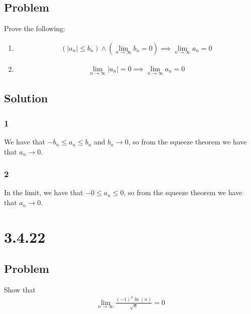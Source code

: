 \documentclass[12pt]{article}
\newcommand{\round}[1]{\left(       #1 \right)      }
\newcommand{\abs}  [1]{\left|       #1 \right|      }
\begin{document}
\subsection*{Problem}
Prove the following:
\begin{enumerate}
    \item \begin{align*}
        \round{\abs{a_n} \leq b_n} \wedge \round{\lim_{n \to \infty} b_n = 0} \implies \lim_{n \to \infty} a_n = 0
    \end{align*}
    \item \begin{align*}
        \lim_{n \to \infty} \abs{a_n} = 0 \implies \lim_{n \to \infty} a_n = 0
    \end{align*}
\end{enumerate}

\subsection*{Solution}

\subsubsection*{1}
We have that $-b_n \leq a_n \leq b_n$ and $b_n \to 0$, so from the squeeze theorem we have that $a_n \to 0$.

\subsubsection*{2}
In the limit, we have that $-0 \leq a_n \leq 0$, so from the squeeze theorem we have that $a_n \to 0$.



\section*{3.4.22}

\subsection*{Problem}
Show that
\begin{align*}
    \lim_{n \to \infty} \frac{(-1)^n \ln(n)}{\sqrt{n}} = 0
\end{align*}
\end{document}
